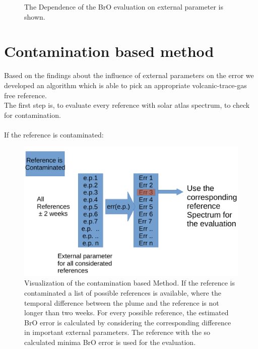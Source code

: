 \documentclass  [
  paper    = a4,
  BCOR     = 10mm,
  twoside,
  fontsize = 12pt,
  fleqn,
  toc      = bibnumbered,
  toc      = listofnumbered,
  numbers  = noendperiod,
  headings = normal,
  listof   = leveldown,
  version  = 3.03
]                                       {scrreprt}
\begin{document}
\begin{figure}
{		}
		\caption{The Dependence of the BrO evaluation on external parameter is shown. }
		\label{fig:alldatacorrwithbrodaytime-plumebro}
	\end{figure}
	
	
	\chapter{Contamination based method}
	Based on the findings about the influence of external parameters on the  error we developed an algorithm which is able to pick an appropriate volcanic-trace-gas free reference.\\ 
	The first step is, to evaluate every reference with solar atlas spectrum, to check for contamination.\\
	\\
	If the reference is contaminated:
	\begin{figure}
\centering
\includegraphics[width=0.7\linewidth]{Bilder/Cont}
\caption{Visualization of the contamination based Method. If the reference is contaminated a list of possible references is available, where the temporal difference between the plume and the reference is not longer than two weeks. For every possible reference, the estimated BrO error is calculated by considering the corresponding difference in important external parameters. The reference with the so calculated minima BrO error is used for the evaluation.}
\label{fig:Cont}
\end{figure}
\end{document}
